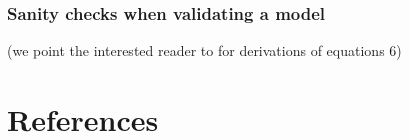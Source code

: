 \documentclass[oneside]{article}
\begin{document}
\subsubsection{Sanity checks when validating a model}



(we point the interested reader to {\color{red}{non-wiki citations here}} for derivations of equations 6)


\section*{References}
\clearpage



\end{document}
